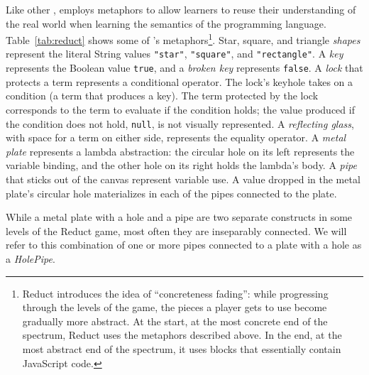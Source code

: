 Like other \nms{},  employs metaphors
to allow learners to reuse their understanding of the real world
when learning the semantics of the programming language.
Table~\ref{tab:reduct} shows some of 's metaphors\footnote{Reduct introduces the idea of ``concreteness fading'':
while progressing through the levels of the game, the pieces a player gets to use become gradually more abstract.
At the start, at the most concrete end of the spectrum, Reduct uses the metaphors described above.
In the end, at the most abstract end of the spectrum, it uses blocks that essentially contain JavaScript code.}.
%
Star, square, and triangle \emph{shapes} represent the literal String values \texttt{"star"}, \texttt{"square"}, and \texttt{"rectangle"}.
A \emph{key} represents the Boolean value \texttt{true}, and a \emph{broken key} represents \texttt{false}.
A \emph{lock} that protects a term represents a conditional operator.
The lock's keyhole takes on a condition (a term that produces a key).
The term protected by the lock corresponds to the term to evaluate if the condition holds;
the value produced if the condition does not hold, \texttt{null}, is not visually represented.
A \emph{reflecting glass}, with space for a term on either side, represents the equality operator.
A \emph{metal plate} represents a lambda abstraction:
the circular hole on its left represents the variable binding,
and the other hole on its right holds the lambda's body.
A \emph{pipe} that sticks out of the canvas represent variable use.
A value dropped in the metal plate's circular hole materializes in each of the pipes connected to the plate.

While a metal plate with a hole and a pipe are two separate constructs in some levels of the Reduct game,
most often they are inseparably connected.
We will refer to this combination of one or more pipes connected to a plate with a hole as a \emph{HolePipe}.

